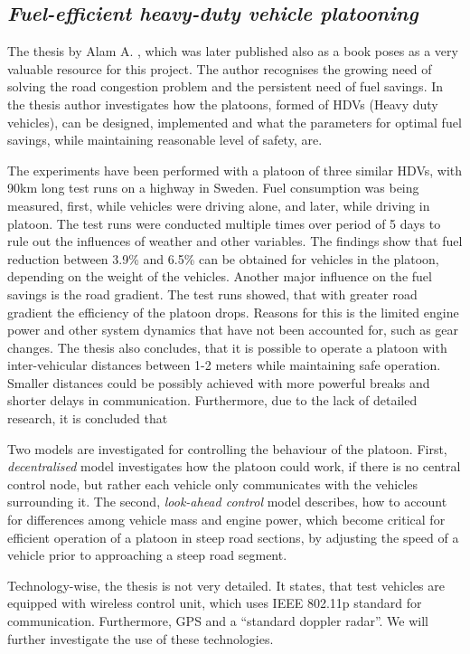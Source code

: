 
\subsection{\textit{Fuel-efficient heavy-duty vehicle platooning}}
The thesis by Alam A. \cite{Alam2014Fuel-efficientPlatooning}, which was later published also as a book poses as a very valuable resource for this project. The author recognises the growing need of solving the road congestion problem and the persistent need of fuel savings. In the thesis author investigates how the platoons, formed of HDVs (Heavy duty vehicles), can be designed, implemented and what the parameters for optimal fuel savings, while maintaining reasonable level of safety, are.\par
% 
% 
The experiments have been performed with a platoon of three similar HDVs, with 90km long test runs on a highway in Sweden. Fuel consumption was being measured, first, while vehicles were driving alone, and later, while driving in platoon. The test runs were conducted multiple times over period of 5 days to rule out the influences of weather and other variables. The findings show that fuel reduction between 3.9\% and 6.5\% can be obtained for vehicles in the platoon, depending on the weight of the vehicles. Another major influence on the fuel savings is the road gradient. The test runs showed, that with greater road gradient the efficiency of the platoon drops. Reasons for this is the limited engine power and other system dynamics that have not been accounted for, such as gear changes. The thesis also concludes, that it is possible to operate a platoon with inter-vehicular distances between 1-2 meters while maintaining safe operation. Smaller distances could be possibly achieved with more powerful breaks and shorter delays in communication. Furthermore, due to the lack of detailed research, it is concluded that 
\par
% 
Two models are investigated for controlling the behaviour of the platoon. First, \emph{decentralised} model investigates how the platoon could work, if there is no central control node, but rather each vehicle only communicates with the vehicles surrounding it. The second, \emph{look-ahead control} model describes, how to account for differences among vehicle mass and engine power, which become critical for efficient operation of a platoon in steep road sections, by adjusting the speed of a vehicle prior to approaching a steep road segment.
\par
% 
Technology-wise, the thesis is not very detailed. It states, that test vehicles are equipped with wireless control unit, which uses IEEE 802.11p standard for communication. Furthermore, GPS and a \enquote{standard doppler radar}. We will further investigate the use of these technologies.
% 
